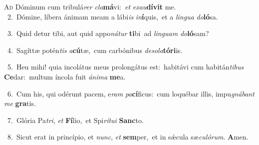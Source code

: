 \lettrine{\initial\textcolor{\initialcolor}{A}}{d} Dóminum cum tribulá\textit{rer} \textit{cla}\-\textbf{má}vi:~\star \textit{et} \textit{ex}\-\textit{au}\textbf{dí}\textbf{vit} me.\\
{\numbfont\textcolor{\numbcolor}{~2.}}~Dómine, líbera ánimam meam a lábi\textit{is} \textit{in}\-\textbf{í}quis,~\star et a \textit{lin}\-\textit{gua} \textit{do}\-\textbf{ló}sa.\par
{\numbfont\textcolor{\numbcolor}{~3.}}~Quid detur tibi, aut quid appo\-\textit{ná}\-\textit{tur} \textbf{ti}\-bi~\star ad \textit{lin}\-\textit{guam} \textit{do}\-\textbf{ló}sam?\par
{\numbfont\textcolor{\numbcolor}{~4.}}~Sagíttæ potén\textit{tis} \textit{a}\-\textbf{cú}tæ,~\star cum carbónibus \textit{de}\-\textit{so}\textit{la}\textbf{tó}\textbf{ri}is.\par
{\numbfont\textcolor{\numbcolor}{~5.}}~Heu mihi! quia incolátus meus prolongátus est:~\dagger habitávi cum habitán\-\textit{ti}\-\textit{bus} \textbf{Ce}\-dar:~\star multum íncola fuit \textit{á}\-\textit{ni}\textit{ma} \textbf{me}\-a.\par
{\numbfont\textcolor{\numbcolor}{~6.}}~Cum his, qui odérunt pacem, e\textit{ram} \textit{pa}\-\textbf{cí}ficus:~\star cum loquébar illis, impu\-\textit{gná}\-\textit{bant} \textit{me} \textbf{gra}\-tis.\par
{\numbfont\textcolor{\numbcolor}{~7.}}~Glória Pa\-\textit{tri}\-, \textit{et} \textbf{Fí}\-lio,~\star et Spi\-\textit{rí}\-\textit{tu}\textit{i} \textbf{Sanc}\-to.\par
{\numbfont\textcolor{\numbcolor}{~8.}}~Sicut erat in princípio, et \textit{nunc}\-, \textit{et} \textbf{sem}\-per,~\star et in sǽcula sæ\-\textit{cu}\-\textit{ló}\textit{rum}. \textbf{A}\-men.\par
